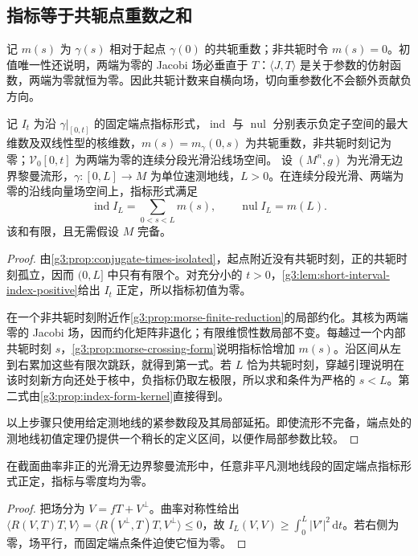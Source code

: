 \subsection{指标等于共轭点重数之和}
\label{g3:subsec:0604:03}

记 \(m(s)\) 为 \(\gamma(s)\) 相对于起点 \(\gamma(0)\) 的共轭重数；非共轭时令 \(m(s)=0\)。初值唯一性还说明，两端为零的 Jacobi 场必垂直于 \(T\)：\(\langle J,T\rangle\) 是关于参数的仿射函数，两端为零就恒为零。因此共轭计数来自横向场，切向重参数化不会额外贡献负方向。

\begin{theorem}\label{g3:thm:morse-index}
	记 \(I_t\) 为沿 \(\gamma|_{[0,t]}\) 的固定端点指标形式，\(\operatorname{ind}\) 与 \(\operatorname{nul}\) 分别表示负定子空间的最大维数及双线性型的核维数，\(m(s)=m_\gamma(0,s)\) 为共轭重数，非共轭时刻记为零；\(\mathcal V_0[0,t]\) 为两端为零的连续分段光滑沿线场空间。
	设 \((M^n,g)\) 为光滑无边界黎曼流形，\(\gamma:[0,L]\to M\) 为单位速测地线，\(L>0\)。在连续分段光滑、两端为零的沿线向量场空间上，指标形式满足
	\begin{equation}\label{g3:eq:morse-index-count}
		\operatorname{ind}I_L=\sum_{0<s<L}m(s),\qquad
		\operatorname{nul}I_L=m(L).
	\end{equation}
	该和有限，且无需假设 \(M\) 完备。
\end{theorem}
\begin{proof}
	由\cref{g3:prop:conjugate-times-isolated}，起点附近没有共轭时刻，正的共轭时刻孤立，因而 \((0,L]\) 中只有有限个。对充分小的 \(t>0\)，\cref{g3:lem:short-interval-index-positive}给出 \(I_t\) 正定，所以指标初值为零。

	在一个非共轭时刻附近作\cref{g3:prop:morse-finite-reduction}的局部约化。其核为两端零的 Jacobi 场，因而约化矩阵非退化；有限维惯性数局部不变。每越过一个内部共轭时刻 \(s\)，\cref{g3:prop:morse-crossing-form}说明指标恰增加 \(m(s)\)。沿区间从左到右累加这些有限次跳跃，就得到第一式。若 \(L\) 恰为共轭时刻，穿越引理说明在该时刻新方向还处于核中，负指标仍取左极限，所以求和条件为严格的 \(s<L\)。第二式由\cref{g3:prop:index-form-kernel}直接得到。

	以上步骤只使用给定测地线的紧参数段及其局部延拓。即使流形不完备，端点处的测地线初值定理仍提供一个稍长的定义区间，以便作局部参数比较。
\end{proof}

\begin{corollary}\label{g3:cor:index-nonpositive-curvature}
	在截面曲率非正的光滑无边界黎曼流形中，任意非平凡测地线段的固定端点指标形式正定，指标与零度均为零。
\end{corollary}
\begin{proof}
	把场分为 \(V=fT+V^\perp\)。曲率对称性给出
	\(\langle R(V,T)T,V\rangle=\langle R(V^\perp,T)T,V^\perp\rangle\le0\)，故
	\(I_L(V,V)\ge\int_0^L|V'|^2\,\mathrm dt\)。若右侧为零，场平行，而固定端点条件迫使它恒为零。
\end{proof}

